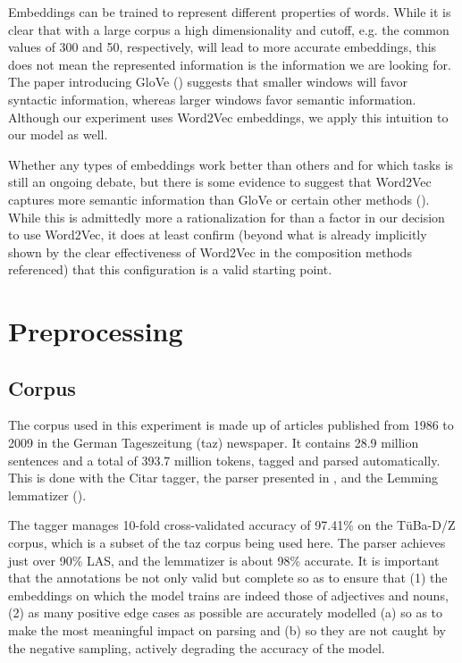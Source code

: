 \documentclass[a4paper, 12pt]{article}
\begin{document}
Embeddings can be trained to represent different properties of words. While it is clear that with a large corpus a high dimensionality and cutoff, e.g. the common values of 300 and 50, respectively, will lead to more accurate embeddings, this does not mean the represented information is the information we are looking for. The paper introducing GloVe (\cite{PenningtonSocherManningGlove}) suggests that smaller windows will favor syntactic information, whereas larger windows favor semantic information. Although our experiment uses Word2Vec embeddings, we apply this intuition to our model as well.

Whether any types of embeddings work better than others and for which tasks is still an ongoing debate, but there is some evidence to suggest that Word2Vec captures more semantic information than GloVe or certain other methods (\cite{SchnabelEmbeddings}). While this is admittedly more a rationalization for than a factor in our decision to use Word2Vec, it does at least confirm (beyond what is already implicitly shown by the clear effectiveness of Word2Vec in the composition methods referenced) that this configuration is a valid starting point.


\section{Preprocessing}

\subsection{Corpus}

The corpus used in this experiment is made up of articles published from 1986 to 2009 in the German Tageszeitung (taz) newspaper. It contains 28.9 million sentences and a total of 393.7 million tokens, tagged and parsed automatically. This is done with the Citar tagger, the parser presented in \cite{deKokParsing}, and the Lemming lemmatizer (\cite{Lemming}).

The tagger manages 10-fold cross-validated accuracy of 97.41\% on the T\"uBa-D/Z corpus, which is a subset of the taz corpus being used here. The parser achieves just over 90\% LAS, and the lemmatizer is about 98\% accurate. It is important that the annotations be not only valid but complete so as to ensure that (1) the embeddings on which the model trains are indeed those of adjectives and nouns, (2) as many positive edge cases as possible are accurately modelled (a) so as to make the most meaningful impact on parsing and (b) so they are not caught by the negative sampling, actively degrading the accuracy of the model.
\end{document}
